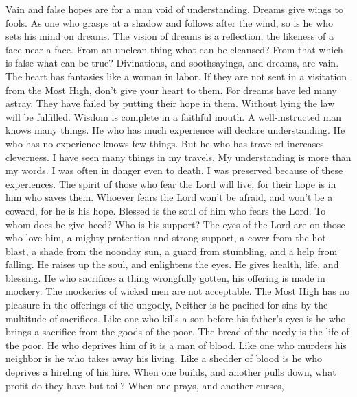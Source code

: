  Vain and false hopes are for a man void of understanding.
Dreams give wings to fools.  As one who grasps at a shadow
and follows after the wind, so is he who sets his mind on dreams.
 The vision of dreams is a reflection, the likeness of a
face near a face.  From an unclean thing what can be
cleansed? From that which is false what can be true? 
Divinations, and soothsayings, and dreams, are vain. The heart has
fantasies like a woman in labor.  If they are not sent in
a visitation from the Most High, don't give your heart to them.
 For dreams have led many astray. They have failed by
putting their hope in them.  Without lying the law will be
fulfilled. Wisdom is complete in a faithful mouth.  A
well-instructed man knows many things. He who has much experience will
declare understanding.  He who has no experience knows
few things. But he who has traveled increases cleverness.
 I have seen many things in my travels. My understanding
is more than my words.  I was often in danger even to
death. I was preserved because of these experiences.  The
spirit of those who fear the Lord will live, for their hope is in him
who saves them.  Whoever fears the Lord won't be afraid,
and won't be a coward, for he is his hope.  Blessed is
the soul of him who fears the Lord. To whom does he give heed? Who is
his support?  The eyes of the Lord are on those who love
him, a mighty protection and strong support, a cover from the hot blast,
a shade from the noonday sun, a guard from stumbling, and a help from
falling.  He raises up the soul, and enlightens the eyes.
He gives health, life, and blessing.  He who sacrifices a
thing wrongfully gotten, his offering is made in mockery. The mockeries
of wicked men are not acceptable.  The Most High has no
pleasure in the offerings of the ungodly, Neither is he pacified for
sins by the multitude of sacrifices.  Like one who kills
a son before his father's eyes is he who brings a sacrifice from the
goods of the poor.  The bread of the needy is the life of
the poor. He who deprives him of it is a man of blood. 
Like one who murders his neighbor is he who takes away his living. Like
a shedder of blood is he who deprives a hireling of his hire.
 When one builds, and another pulls down, what profit do
they have but toil?  When one prays, and another curses,
